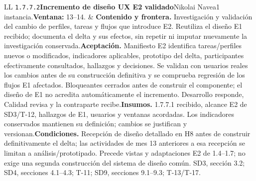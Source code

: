 \begin{longtable}{L{\tabcolsep\relax}L{\tabcolsep\relax}}
\texttt{1.\allowbreak{}7.\allowbreak{}7.\allowbreak{}2}\newline{}\textbf{Incremento de diseño UX E2 validado}\newline{}Nikolai Navea\newline{}1 instancia.\newline{}\textbf{Ventana:} 13--14. & \textbf{Contenido y frontera.} Investigación y validación del cambio de perfiles, tareas y flujos que introduce E2. Reutiliza el diseño E1 recibido; documenta el delta y sus efectos, sin repetir ni imputar nuevamente la investigación conservada.\newline{}\textbf{Aceptación.} Manifiesto E2 identifica tareas/perfiles nuevos o modificados, indicadores aplicables, prototipo del delta, participantes efectivamente consultados, hallazgos y decisiones. Se validan con usuarios reales los cambios antes de su construcción definitiva y se comprueba regresión de los flujos E1 afectados. Bloqueantes cerrados antes de construir el componente; el diseño de E1 no acredita automáticamente el incremento. Desarrollo responde, Calidad revisa y la contraparte recibe.\newline{}\textbf{Insumos.} 1.7.7.1 recibido, alcance E2 de SD3/T-12, hallazgos de E1, usuarios y ventanas acordadas. Los indicadores conservados mantienen su definición; cambios se justifican y versionan.\newline{}\textbf{Condiciones.} Recepción de diseño detallado en H8 antes de construir definitivamente el delta; las actividades de mes 13 anteriores a esa recepción se limitan a análisis/prototipado. Precede vistas y adaptaciones E2 de 1.4--1.7; no exige una segunda construcción del sistema de diseño común. SD3, sección 3.2; SD4, secciones 4.1--4.3; T-11; SD9, secciones 9.1--9.3; T-13/T-17.\\\hline

\end{longtable}
